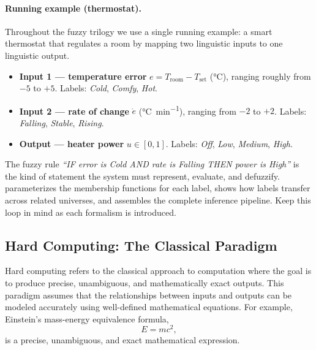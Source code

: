 \paragraph{Running example (thermostat).}\label{par:softcomp_thermostat_intro}
Throughout the fuzzy trilogy we use a single running example: a smart thermostat that regulates a room by mapping two linguistic inputs to one linguistic output.

\begin{itemize}
    \item \textbf{Input 1 --- temperature error} \(e = T_{\text{room}} - T_{\text{set}}\) (\si{\celsius}), ranging roughly from \(-5\) to \(+5\). Labels: \textit{Cold}, \textit{Comfy}, \textit{Hot}.
    \item \textbf{Input 2 --- rate of change} \(\dot{e}\) (\si{\celsius\per\minute}), ranging from \(-2\) to \(+2\). Labels: \textit{Falling}, \textit{Stable}, \textit{Rising}.
    \item \textbf{Output --- heater power} \(u \in [0,1]\). Labels: \textit{Off}, \textit{Low}, \textit{Medium}, \textit{High}.
\end{itemize}

The fuzzy rule \emph{``IF error is Cold AND rate is Falling THEN power is High''} is the kind of statement the system must represent, evaluate, and defuzzify.  parameterizes the membership functions for each label,  shows how labels transfer across related universes, and  assembles the complete inference pipeline. Keep this loop in mind as each formalism is introduced.

\subsection{Hard Computing: The Classical Paradigm}
\label{sec:softcomp_hard_computing_the_classical_paradigm}

Hard computing refers to the classical approach to computation where the goal is to produce precise, unambiguous, and mathematically exact outputs. This paradigm assumes that the relationships between inputs and outputs can be modeled accurately using well-defined mathematical equations. For example, Einstein's mass-energy equivalence formula,
\begin{equation}
E = mc^2,
\label{eq:softcomp_emc2}
\end{equation}
is a precise, unambiguous, and exact mathematical expression.

